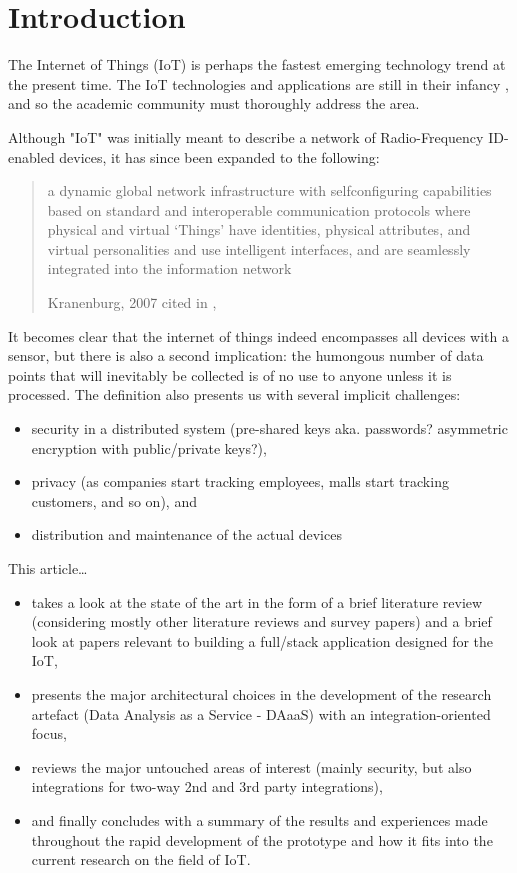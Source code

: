 \section{Introduction}
The Internet of Things (IoT) is perhaps the fastest emerging technology trend at the present time. The IoT technologies and applications are still in their infancy \autocite{xu-he-li:internet-of-things-in-industries-a-survery:2014}, and so the academic community must thoroughly address the area.

Although "IoT" was initially meant to describe a network of Radio-Frequency ID-enabled devices, it has since been expanded to the following:

\blockquote[{Kranenburg, 2007 cited in \citeauthor{xu-he-li:internet-of-things-in-industries-a-survery:2014}, \citeyear[1]{xu-he-li:internet-of-things-in-industries-a-survery:2014}}]{a dynamic global network infrastructure with selfconfiguring capabilities based on standard and interoperable communication protocols where physical and virtual ‘Things’ have identities, physical attributes, and virtual personalities and use intelligent interfaces, and are seamlessly integrated into the information network}.

It becomes clear that the internet of things indeed encompasses all devices with a sensor, but there is also a second implication: the humongous number of data points that will inevitably be collected is of no use to anyone unless it is processed. The definition also presents us with several implicit challenges:

\begin{itemize}
  \item security in a distributed system (pre-shared keys aka. passwords? asymmetric encryption with public/private keys?),
  \item privacy (as companies start tracking employees, malls start tracking customers, and so on), and
  \item distribution and maintenance of the actual devices
\end{itemize}



This article\dots
\begin{itemize}
    \item takes a look at the state of the art in the form of a brief literature review (considering mostly other literature reviews and survey papers) and a brief look at papers relevant to building a full/stack application designed for the IoT,
    \item presents the major architectural choices in the development of the research artefact (Data Analysis as a Service - DAaaS) with an integration-oriented focus,
    \item reviews the major untouched areas of interest (mainly security, but also integrations for two-way 2nd and 3rd party integrations),
    \item and finally concludes with a summary of the results and experiences made throughout the rapid development of the prototype and how it fits into the current research on the field of IoT.
\end{itemize}
